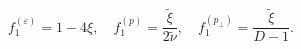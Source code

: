 \begin{equation}\label{f1q}
f_1^{(\varepsilon )}=1-4\xi ,\quad f_1^{(p)}=\frac{\tilde
\xi}{2\tilde \nu },\quad f_1^{(p_{\perp })}=\frac{\tilde
\xi}{D-1}.
\end{equation}

